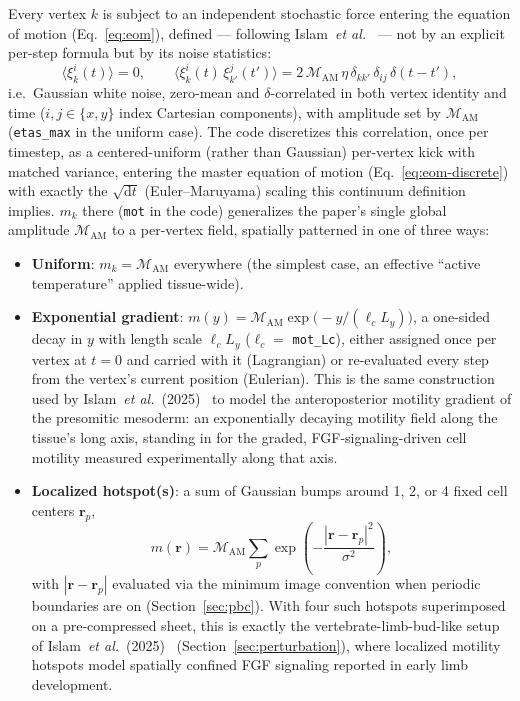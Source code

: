 \documentclass[11pt]{article}
\newcommand{\rvec}{\mathbf{r}}
\newcommand{\ord}{\mathrm{d}}
\begin{document}
Every vertex $k$ is subject to an independent stochastic force entering the equation of
motion (Eq.~\eqref{eq:eom}), defined --- following Islam~\emph{et al.}~\cite{islam2025,islam2026}
--- not by an explicit per-step formula but by its noise statistics:
\begin{equation}
  \big\langle \xi_k^{i}(t)\big\rangle = 0, \qquad
  \big\langle \xi_k^{i}(t)\,\xi_{k'}^{j}(t')\big\rangle
  = 2\,\mathcal M_{\mathrm{AM}}\,\eta\,\delta_{kk'}\,\delta_{ij}\,\delta(t-t'),
  \label{eq:motility}
\end{equation}
i.e.\ Gaussian white noise, zero-mean and $\delta$-correlated in both vertex identity
and time ($i,j\in\{x,y\}$ index Cartesian components), with amplitude set by
$\mathcal M_{\mathrm{AM}}$ (\texttt{etas\_max} in the uniform case). The code discretizes
this correlation, once per timestep, as a centered-uniform (rather than Gaussian)
per-vertex kick with matched variance, entering the master equation of motion
(Eq.~\eqref{eq:eom-discrete}) with exactly the $\sqrt{\ord t}$ (Euler--Maruyama) scaling
this continuum definition implies. $m_k$ there (\texttt{mot} in the code) generalizes
the paper's single global amplitude $\mathcal M_{\mathrm{AM}}$ to a per-vertex field,
spatially patterned in one of three ways:
\begin{itemize}
  \item \textbf{Uniform}: $m_k = \mathcal M_{\mathrm{AM}}$ everywhere (the simplest case, an
  effective ``active temperature'' applied tissue-wide).
  \item \textbf{Exponential gradient}: $m(y) = \mathcal M_{\mathrm{AM}}\exp\!\big(-y/(\ell_c L_y)\big)$,
  a one-sided decay in $y$ with length scale $\ell_c L_y$ ($\ell_c=$ \texttt{mot\_Lc}),
  either assigned once per vertex at $t=0$ and carried with it (Lagrangian) or
  re-evaluated every step from the vertex's current position (Eulerian). This is the
  same construction used by Islam~\emph{et al.}~(2025)~\cite{islam2025} to model the
  anteroposterior motility gradient of the presomitic mesoderm: an exponentially
  decaying motility field along the tissue's long axis, standing in for the graded,
  FGF-signaling-driven cell motility measured experimentally along that axis.
  \item \textbf{Localized hotspot(s)}: a sum of Gaussian bumps around 1, 2, or 4 fixed
  cell centers $\rvec_p$,
  \[
    m(\rvec) = \mathcal M_{\mathrm{AM}}\sum_{p} \exp\!\left(-\frac{|\rvec-\rvec_p|^2}{\sigma^2}\right),
  \]
  with $|\rvec-\rvec_p|$ evaluated via the minimum image convention when periodic
  boundaries are on (Section~\ref{sec:pbc}). With four such hotspots superimposed on a
  pre-compressed sheet, this is exactly the vertebrate-limb-bud-like setup of
  Islam~\emph{et al.}~(2025)~\cite{islam2025} (Section~\ref{sec:perturbation}), where
  localized motility hotspots model spatially confined FGF signaling reported in
  early limb development.
\end{itemize}
\end{document}
